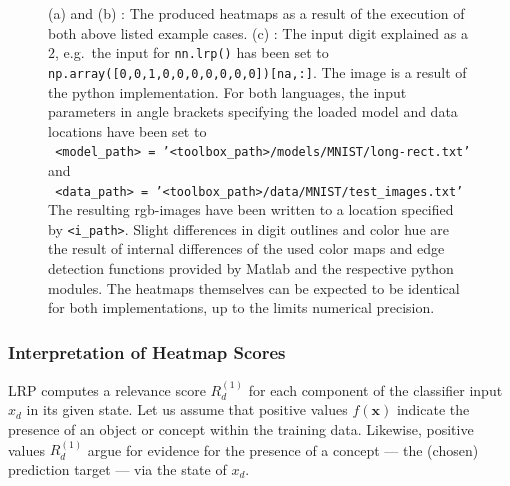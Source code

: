 \documentclass[a4wide]{article}
\newcommand{\x}{\boldsymbol{x}}
\begin{document}
\begin{figure}[h]
\centering
{}
\hspace{0.11\textwidth}
\hspace{0.11\textwidth}
\caption{(a) and (b) : The produced heatmaps as a result of the execution of both above listed example cases. (c) : The input digit explained as a $2$, e.g.~the input for \texttt{nn.lrp()} has been set to \texttt{np.array([0,0,1,0,0,0,0,0,0,0])[na,:]}. The image is a result of the python implementation.  For both languages, the input parameters in angle brackets specifying the loaded model and data locations have been set to\\
\texttt{ <model\_path> = '<toolbox\_path>/models/MNIST/long-rect.txt'} and\\
\texttt{ <data\_path> =  '<toolbox\_path>/data/MNIST/test\_images.txt'}\\
The resulting rgb-images have been written to a location specified by \texttt{<i\_path>}.
Slight differences in digit outlines and color hue are the result of internal differences of the used color maps and edge detection functions provided by Matlab and the respective python modules. The heatmaps themselves can be expected to be identical for both implementations, up to the limits numerical precision.}
\label{fig:example}
\end{figure}

\subsubsection*{Interpretation of Heatmap Scores}
LRP computes a relevance score $R_d^{(1)}$ for each component of the classifier input $x_d$ in its given state. Let us assume that positive values $f(\x)$ indicate the presence of an object or concept within the training data.
Likewise, positive values $R_d^{(1)}$ argue for evidence for the presence of a concept --- the (chosen) prediction target --- via the state of $x_d$. 
\end{document}
